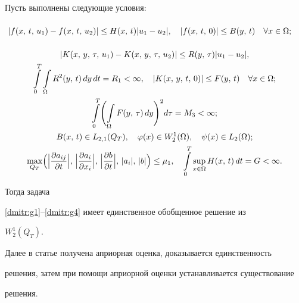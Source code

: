 \begin{theorem} Пусть выполнены следующие условия{\rm:}


\begin{gather*}


 |f(x,\,t,\,u_1)-f(x,\,t,\,u_2)|\le H(x,\,t)|u_1-u_2|,\quad|f(x,\,t,\,0)|\le B(y,\,t)\quad \forall x\in\Omega;\phantom{\int\limits_1}


\\


|K(x,\,y,\,\tau,\,u_1)-K(x,\,y,\,\tau,\,u_2)|\le R(y,\,\tau)|u_1-u_2|,\\


\int\limits_0^T\int\limits_{\Omega}R^2(y,\,t)\,dy\,dt =R_1<\infty, \quad


|K(x,\,y,\,t,\,0)|\le F(y,\,t)\quad\forall x\in\Omega;


\\


\int\limits_0^T\Biggl(\int\limits_{\Omega}F(y,\,\tau)\,dy\Biggr)^2d\tau=M_3<\infty;


\\


B(x,\,t)\in L_{2,1}(Q_{T}),\quad\varphi(x)\in W_2^1(\Omega),\quad \psi(x)\in L_2(\Omega);


\\


\max\limits_{Q_T}\Bigl( \Bigl|\frac{\partial a_{ij}}{\partial t}\Bigr|,\,


\Bigl|\frac{\partial a_i}{\partial x_i}\Bigr|,\, \Bigl|\frac{\partial b}{\partial t}\Bigr|,\, |a_i|,\, |b|\Bigr)\le


\mu_1,\quad\int\limits_0^T\sup\limits_{x\in\Omega}H(x,\,t)\,dt=G<\infty.


\end{gather*}


Тогда задача


\eqref{dmitr:g1}--\eqref{dmitr:g4} имеет единственное обобщенное решение из


$W_2^1(Q_{T})$.


 \end{theorem}





Далее в статье получена априорная оценка, доказывается единственность


решения, затем при помощи априорной оценки устанавливается существование


решения.





